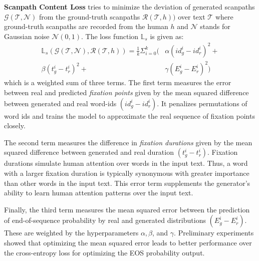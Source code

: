  \textbf{Scanpath Content Loss} tries to minimize the deviation of generated scanpaths $\mathcal{G}(\mathcal{T}, \mathcal{N})$ from the ground-truth scanpaths $\mathcal{R}(\mathcal{T}, h))$ over text $\mathcal{T}$ where ground-truth scanpaths are recorded from the human $h$ and $\mathcal{N}$ stands for Gaussian noise $\mathcal{N}(0, 1)$. The loss function $\mathbb{L}_s$ is given as:
\begin{equation}
    \label{eq:Scanpath Content Loss}
    \begin{aligned}
    \mathbb{L}_s(\mathcal{G}(\mathcal{T,}\mathcal{N}), \mathcal{R}(\mathcal{T},h)) = \frac{1}{k} \Sigma_{i=0}^{k}(&\alpha(id_g^i-id_r^i)^2 + \\ \beta(t_g^i-t_r^i)^2 + &\gamma (E_g^i-E_r^i)^2)
    \end{aligned}
\end{equation}
which is a weighted sum of three terms. The first term measures the error between real and predicted \textit{fixation points} given by the mean squared difference between generated and real word-ids $(id_g^i-id_r^i)$. It penalizes permutations of word ids and trains the model to approximate the real sequence of fixation points closely.

The second term measures the difference in \textit{fixation durations} given by the mean squared difference between generated and real duration $(t_g^i-t_r^i)$. Fixation durations simulate human attention over words in the input text. Thus, a word with a larger fixation duration is typically synonymous with greater importance than other words in the input text. This error term supplements the generator's ability to learn human attention patterns over the input text.

Finally, the third term measures the mean squared error between the prediction of end-of-sequence probability by real and generated distributions $(E_g^i-E_r^i)$. These are weighted by the hyperparameters $\alpha,\beta$, and $\gamma$. Preliminary experiments showed that optimizing the mean squared error leads to better performance over the cross-entropy loss for optimizing the EOS probability output.

